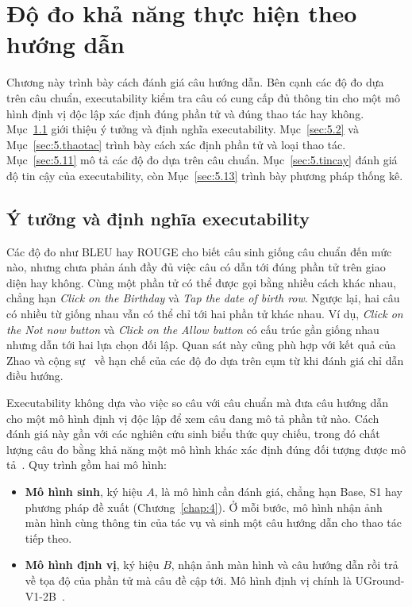 \chapter{Độ đo khả năng thực hiện theo hướng dẫn}
\label{chap:5}

Chương này trình bày cách đánh giá câu hướng dẫn. Bên cạnh các độ đo dựa trên câu chuẩn, executability kiểm tra câu có cung cấp đủ thông tin cho một mô hình định vị độc lập xác định đúng phần tử và đúng thao tác hay không. Mục~\ref{sec:5.1} giới thiệu ý tưởng và định nghĩa executability. Mục~\ref{sec:5.2} và Mục~\ref{sec:5.thaotac} trình bày cách xác định phần tử và loại thao tác. Mục~\ref{sec:5.11} mô tả các độ đo dựa trên câu chuẩn. Mục~\ref{sec:5.tincay} đánh giá độ tin cậy của executability, còn Mục~\ref{sec:5.13} trình bày phương pháp thống kê.

\section{Ý tưởng và định nghĩa executability}\label{sec:5.1}

Các độ đo như BLEU hay ROUGE cho biết câu sinh giống câu chuẩn đến mức nào, nhưng chưa phản ánh đầy đủ việc câu có dẫn tới đúng phần tử trên giao diện hay không. Cùng một phần tử có thể được gọi bằng nhiều cách khác nhau, chẳng hạn \emph{Click on the Birthday} và \emph{Tap the date of birth row}. Ngược lại, hai câu có nhiều từ giống nhau vẫn có thể chỉ tới hai phần tử khác nhau. Ví dụ, \emph{Click on the Not now button} và \emph{Click on the Allow button} có cấu trúc gần giống nhau nhưng dẫn tới hai lựa chọn đối lập. Quan sát này cũng phù hợp với kết quả của Zhao và cộng sự~\cite{zhao2021} về hạn chế của các độ đo dựa trên cụm từ khi đánh giá chỉ dẫn điều hướng.

Executability không dựa vào việc so câu với câu chuẩn mà đưa câu hướng dẫn cho một mô hình định vị độc lập để xem câu đang mô tả phần tử nào. Cách đánh giá này gần với các nghiên cứu sinh biểu thức quy chiếu, trong đó chất lượng câu đo bằng khả năng một mô hình khác xác định đúng đối tượng được mô tả~\cite{mao2016,luo2017}. Quy trình gồm hai mô hình:

\begin{itemize}
\item \textbf{Mô hình sinh}, ký hiệu $A$, là mô hình cần đánh giá, chẳng hạn Base, S1 hay phương pháp đề xuất (Chương~\ref{chap:4}). Ở mỗi bước, mô hình nhận ảnh màn hình cùng thông tin của tác vụ và sinh một câu hướng dẫn cho thao tác tiếp theo.
\item \textbf{Mô hình định vị}, ký hiệu $B$, nhận ảnh màn hình và câu hướng dẫn rồi trả về tọa độ của phần tử mà câu đề cập tới. Mô hình định vị chính là UGround-V1-2B~\cite{uground}.
\end{itemize}

